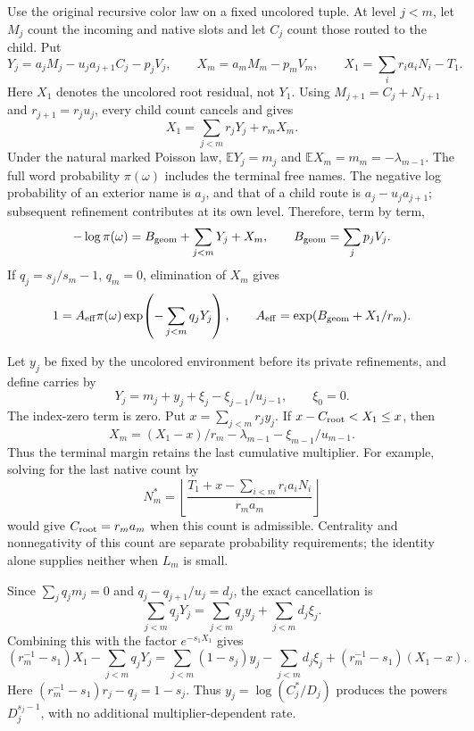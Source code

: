 Use the original recursive color law on a fixed uncolored tuple.
At level $j<m$, let $M_j$ count the incoming and native slots and let
$C_j$ count those routed to the child. Put
\[
 Y_j=a_jM_j-u_ja_{j+1}C_j-p_jV_j,\qquad
 X_m=a_mM_m-p_mV_m,\qquad
 X_1=\sum_ir_ia_iN_i-T_1.
\]
Here $X_1$ denotes the uncolored root residual, not $Y_1$.
Using $M_{j+1}=C_j+N_{j+1}$ and $r_{j+1}=r_ju_j$, every child count
cancels and gives
\begin{equation}
 X_1=\sum_{j<m}r_jY_j+r_mX_m.
 \label{paper:ep-root-telescope}
\end{equation}
Under the natural marked Poisson law,
$\mathbb EY_j=m_j$ and $\mathbb EX_m=m_m=-\lambda_{m-1}$.
The full word probability $\pi(\omega)$ includes the terminal free names.
The negative log probability of an exterior name is $a_j$, and that of
a child route is $a_j-u_ja_{j+1}$; subsequent refinement contributes at
its own level. Therefore, term by term,
\begin{equation}
 -\log\pi(\omega)=B_{\rm geom}+\sum_{j<m}Y_j+X_m,
 \qquad B_{\rm geom}=\sum_jp_jV_j.
 \label{paper:ep-word-density}
\end{equation}
If $q_j=s_j/s_m-1$, $q_m=0$, elimination of $X_m$ gives
\begin{equation}
 1=A_{\rm eff}\pi(\omega)
       \exp\!\left(-\sum_{j<m}q_jY_j\right),\qquad
 A_{\rm eff}=\exp(B_{\rm geom}+X_1/r_m).
 \label{paper:ep-rn}
\end{equation}

Let $y_j$ be fixed by the uncolored environment before its private
refinements, and define carries by
\begin{equation}
 Y_j=m_j+y_j+\xi_j-\xi_{j-1}/u_{j-1},\qquad \xi_0=0.
 \label{paper:ep-carry-bands}
\end{equation}
The index-zero term is zero. Put $x=\sum_{j<m}r_jy_j$. If
$x-C_{\rm root}<X_1\le x$, then
\begin{equation}
 X_m=(X_1-x)/r_m-\lambda_{m-1}-\xi_{m-1}/u_{m-1}.
 \label{paper:ep-terminal-margin}
\end{equation}
Thus the terminal margin retains the last cumulative multiplier.
For example, solving for the last native count by
\[
 N_m^*=\left\lfloor
 \frac{T_1+x-\sum_{i<m}r_ia_iN_i}{r_ma_m}\right\rfloor
\]
would give $C_{\rm root}=r_ma_m$ when this count is admissible.
Centrality and nonnegativity of this count are separate probability
requirements; the identity alone supplies neither when $L_m$ is small.

Since $\sum_jq_jm_j=0$ and $q_j-q_{j+1}/u_j=d_j$, the exact cancellation is
\begin{equation}
 \sum_{j<m}q_jY_j=\sum_{j<m}q_jy_j+\sum_{j<m}d_j\xi_j.
 \label{paper:ep-likelihood-cancel}
\end{equation}
Combining this with the factor $e^{-s_1X_1}$ gives
\begin{equation}
 (r_m^{-1}-s_1)X_1-\sum_{j<m}q_jY_j
 =\sum_{j<m}(1-s_j)y_j-\sum_{j<m}d_j\xi_j
        +(r_m^{-1}-s_1)(X_1-x).
 \label{paper:ep-full-tilt}
\end{equation}
Here $(r_m^{-1}-s_1)r_j-q_j=1-s_j$.
Thus $y_j=\log(C_j^*/D_j)$ produces the powers $D_j^{s_j-1}$,
with no additional multiplier-dependent rate.

